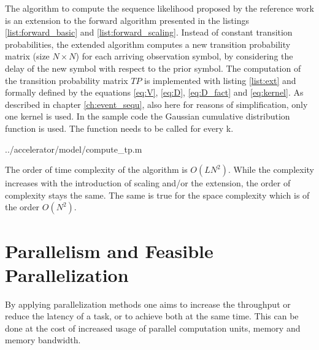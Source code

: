\documentclass[mscthesis]{usiinfthesis}
\begin{document}
The algorithm to compute the sequence likelihood proposed by the reference work
is an extension to the forward algorithm presented in the listings
\ref{list:forward_basic} and \ref{list:forward_scaling}. Instead of constant
transition probabilities, the extended algorithm computes a new transition
probability matrix (size $ N \times N$) for each arriving observation symbol,
by considering the delay of the new symbol with respect to the prior symbol.
The computation of the transition probability matrix $ TP $ is implemented with
listing \ref{list:ext} and formally defined by the equations \ref{eq:V},
\ref{eq:D}, \ref{eq:D_fact} and \ref{eq:kernel}. As described in chapter
\ref{ch:event_sequ}, also here for reasons of simplification, only one kernel
is used. In the sample code the Gaussian cumulative distribution function is
used. The function needs to be called for every k.


    {../accelerator/model/compute_tp.m}

The order of time complexity of the algorithm is $O(LN^2)$. While the
complexity increases with the introduction of scaling and/or the extension, the
order of complexity stays the same. The same is true for the space complexity
which is of the order $O(N^2)$.

\section{Parallelism and Feasible Parallelization}
\label{ch:analysis_parallel}

By applying parallelization methods one aims to increase the throughput or
reduce the latency of a task, or to achieve both at the same time. This can be
done at the cost of increased usage of parallel computation units, memory and
memory bandwidth.
\end{document}
